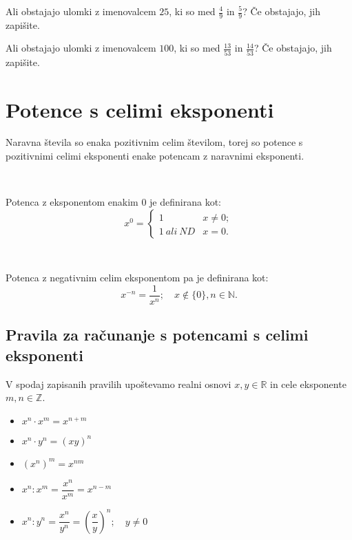         
                    \begin{naloga}
                        Ali obstajajo ulomki z imenovalcem $25$, ki so med $\frac{4}{9}$ in $\frac{5}{9}$? Če obstajajo, jih zapišite.
                        
                    \end{naloga}
        
                    \begin{naloga}
                        Ali obstajajo ulomki z imenovalcem $100$, ki so med $\frac{13}{53}$ in $\frac{14}{53}$? Če obstajajo, jih zapišite.
                        
                    \end{naloga}
        
        

                    
    \newpage

    \section{Potence s celimi eksponenti}

            Naravna števila so enaka pozitivnim celim številom, torej so potence s pozitivnimi celimi eksponenti enake potencam z naravnimi eksponenti.

            ~

            Potenca z eksponentom enakim $0$ je definirana kot: 
            $$x^0=\begin{cases}
                    1 &x\neq 0; \\
                    1 ~ali~ND &x=0.
                \end{cases}$$

            ~

            Potenca z negativnim celim eksponentom pa je definirana kot:
            $$x^{-n}=\dfrac{1}{x^n}; \quad x\notin\{0\}, n\in\mathbb{N}.$$

            
        \subsection*{Pravila za računanje s potencami s celimi eksponenti}
            V spodaj zapisanih pravilih upoštevamo realni osnovi $x,y\in\mathbb{R}$ in cele eksponente $m,n\in\mathbb{Z}$.
            \begin{itemize}
                \item $x^n\cdot x^m=x^{n+m}$
                \item $x^n\cdot y^n=(xy)^n$
                \item $\left(x^n\right)^m=x^{nm}$
                \item $x^n:x^m=\dfrac{x^n}{x^m}=x^{n-m}$
                \item $x^n:y^n=\dfrac{x^n}{y^n}=\left(\dfrac{x}{y}\right)^n; \quad y\neq 0$
            \end{itemize}


